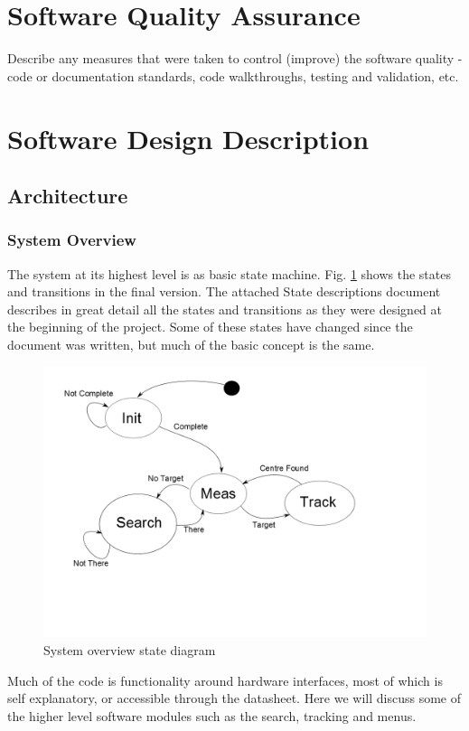 \documentclass[]{report}
\begin{document}
\section{Software Quality Assurance}
Describe any measures that were taken to control (improve) the software quality - code or documentation standards, code walkthroughs, testing and validation, etc.

\section{Software Design Description}
\subsection{Architecture}
\subsubsection{System Overview}
The system at its highest level is as basic state machine. Fig. \ref{fig:OperationStateTransitionDiagram} shows the states and transitions in the final version. The attached State descriptions document describes in great detail all the states and transitions as they were designed at the beginning of the project. Some of these states have changed since the document was written, but much of the basic concept is the same.

\begin{figure}
	\centering
	\includegraphics[width=0.7\linewidth]{"../Diagrams/Operation State Transition Diagram"}
	\caption[State Diagram]{System overview state diagram}
	\label{fig:OperationStateTransitionDiagram}
\end{figure}

Much of the code is functionality around hardware interfaces, most of which is self explanatory, or accessible through the datasheet. Here we will discuss some of the higher level software modules such as the search, tracking and menus.
\end{document}
